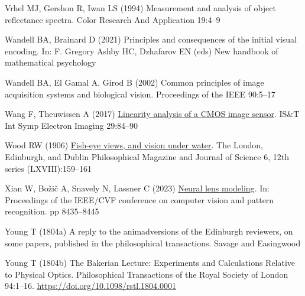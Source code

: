 \documentclass[
  letterpaper,
]{book}
\newlength{\cslhangindent}
\newenvironment{CSLReferences}[2] %
 {\begin{list}{}{%
  \setlength{\itemindent}{0pt}
  \setlength{\leftmargin}{0pt}
  \setlength{\parsep}{0pt}
  \ifodd #1
   \setlength{\leftmargin}{\cslhangindent}
   \setlength{\itemindent}{-1\cslhangindent}
  \fi
  \setlength{\itemsep}{#2\baselineskip}}}
 {\end{list}}
\begin{document}
\begin{CSLReferences}{1}{1}
Vrhel MJ, Gershon R, Iwan LS (1994) Measurement and analysis of object
reflectance spectra. Color Research And Application 19:4--9

Wandell BA, Brainard D (2021) Principles and consequences of the initial
visual encoding. In: F. Gregory Ashby HC, Dzhafarov EN (eds) New
handbook of mathematical psychology

Wandell BA, El Gamal A, Girod B (2002) Common principles of image
acquisition systems and biological vision. Proceedings of the IEEE
90:5--17

Wang F, Theuwissen A (2017)
\href{http://dx.doi.org/10.2352/issn.2470-1173.2017.11.imse-191}{Linearity
analysis of a {CMOS} image sensor}. IS\&T Int Symp Electron Imaging
29:84--90

Wood RW (1906)
\href{https://en.wikipedia.org/wiki/Fisheye_lens}{Fish-eye views, and
vision under water}. The London, Edinburgh, and Dublin Philosophical
Magazine and Journal of Science 6, 12th series (LXVIII):159--161

Xian W, Božič A, Snavely N, Lassner C (2023)
\href{https://openaccess.thecvf.com/content/CVPR2023/html/Xian_Neural_Lens_Modeling_CVPR_2023_paper.html}{Neural
lens modeling}. In: Proceedings of the IEEE/CVF conference on computer
vision and pattern recognition. pp 8435--8445

Young T (1804a) A reply to the animadversions of the {Edinburgh}
reviewers, on some papers, published in the philosophical transactions.
{Savage and Easingwood}

Young T (1804b) {The Bakerian Lecture: Experiments and Calculations
Relative to Physical Optics}. Philosophical Transactions of the Royal
Society of London 94:1--16. \url{https://doi.org/10.1098/rstl.1804.0001}

\end{CSLReferences}


\backmatter
\end{document}
